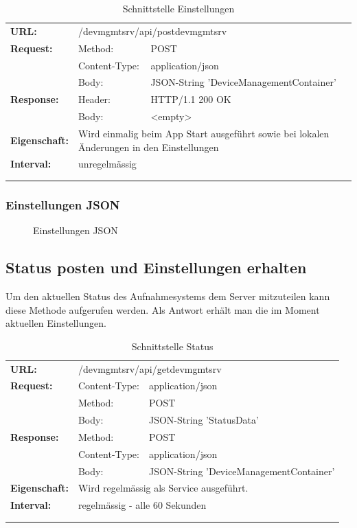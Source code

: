 {\renewcommand{\arraystretch}{1}
    \begin{longtable}{ p{2.5cm} p{3.5cm} p{6cm}}
	\textbf{URL:} & \multicolumn{2}{l}{/devmgmtsrv/api/postdevmgmtsrv} \\
	\textbf{Request:} & Method: & POST \\
		& Content-Type: & application/json \\
		& Body: & JSON-String 'DeviceManagementContainer'\\
	\textbf{Response:} &  Header: & HTTP/1.1 200 OK \\
		& Body: & <empty>	\\
	\textbf{Eigenschaft:} & \multicolumn{2}{p{10cm}}{Wird einmalig beim App Start ausgeführt sowie bei lokalen Änderungen in den Einstellungen} \\
	\textbf{Interval:} & \multicolumn{2}{p{10cm}}{unregelmässig} \\
	\\
\caption{Schnittstelle Einstellungen}
\end{longtable}}

\subsubsection{Einstellungen JSON}
\begin{figure}[H]
	\centering
	
	\caption{Einstellungen JSON}
\end{figure}

\subsection{Status posten und Einstellungen erhalten}

Um den aktuellen Status des Aufnahmesystems dem Server mitzuteilen kann diese Methode aufgerufen werden. Als Antwort erhält man die im Moment aktuellen Einstellungen.

{\renewcommand{\arraystretch}{1}
    \begin{longtable}{ p{2.5cm} p{3.5cm} p{6cm}} 
	\textbf{URL:} & \multicolumn{2}{l}{/devmgmtsrv/api/getdevmgmtsrv} \\
	\textbf{Request:} & Content-Type: & application/json \\
		& Method: & POST \\
		& Body: & JSON-String 'StatusData' \\
	\textbf{Response:} & Method: & POST \\
		& Content-Type: & application/json \\
		& Body: & JSON-String 'DeviceManagementContainer' \\
	\textbf{Eigenschaft:} & \multicolumn{2}{p{10cm}}{Wird regelmässig als Service ausgeführt.} \\ 
	\textbf{Interval:} & \multicolumn{2}{p{10cm}}{regelmässig - alle 60 Sekunden} \\
	\\
\caption{Schnittstelle Status}
\end{longtable}	}
